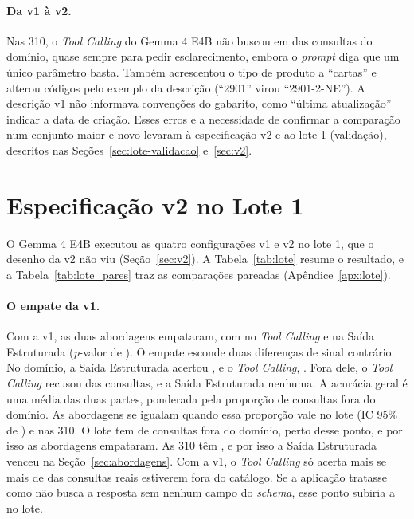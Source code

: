 \paragraph{Da v1 à v2.} Nas 310, o \textit{Tool Calling} do Gemma 4 E4B não buscou em  das consultas do domínio, quase sempre para pedir esclarecimento, embora o \textit{prompt} diga que um único parâmetro basta. Também acrescentou o tipo de produto a ``cartas'' e alterou códigos pelo exemplo da descrição (``2901'' virou ``2901-2-NE''). A descrição v1 não informava convenções do gabarito, como ``última atualização'' indicar a data de criação. Esses erros e a necessidade de confirmar a comparação num conjunto maior e novo levaram à especificação v2 e ao lote 1 (validação), descritos nas Seções~\ref{sec:lote-validacao} e~\ref{sec:v2}.

\section{Especificação v2 no Lote 1}
\label{sec:lote-resultados}

O Gemma 4 E4B executou as quatro configurações v1 e v2 no lote 1, que o desenho da v2 não viu (Seção~\ref{sec:v2}). A Tabela~\ref{tab:lote} resume o resultado, e a Tabela~\ref{tab:lote_pares} traz as comparações pareadas (Apêndice~\ref{apx:lote}).

\begin{landscape}
\end{landscape}

\paragraph{O empate da v1.} Com a v1, as duas abordagens empataram, com  no \textit{Tool Calling} e  na Saída Estruturada (\textit{p}-valor de ). O empate esconde duas diferenças de sinal contrário. No domínio, a Saída Estruturada acertou , e o \textit{Tool Calling}, . Fora dele, o \textit{Tool Calling} recusou  das consultas, e a Saída Estruturada nenhuma. A acurácia geral é uma média das duas partes, ponderada pela proporção de consultas fora do domínio. As abordagens se igualam quando essa proporção vale  no lote (IC 95\% de ) e  nas 310. O lote tem  de consultas fora do domínio, perto desse ponto, e por isso as abordagens empataram. As 310 têm , e por isso a Saída Estruturada venceu na Seção~\ref{sec:abordagens}. Com a v1, o \textit{Tool Calling} só acerta mais se mais de  das consultas reais estiverem fora do catálogo. Se a aplicação tratasse como não busca a resposta sem nenhum campo do \textit{schema}, esse ponto subiria a  no lote.

